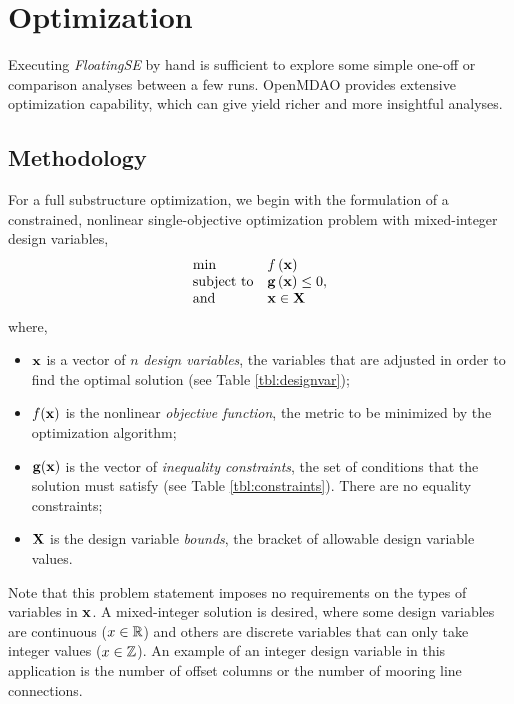 \chapter{Optimization}
\label{sec:opt}
Executing \textit{FloatingSE} by hand is sufficient to explore some simple
one-off or comparison analyses between a few runs.  OpenMDAO
provides extensive optimization capability, which can give yield richer
and more insightful analyses.

\section{Methodology}
For a full substructure optimization, we begin with the formulation of
a constrained, nonlinear single-objective optimization problem with
mixed-integer design variables,
\begin{equation}
\begin{array}{ll}
  \min & f\left(\mathbf{x}\right)\\
  \text{subject to} & \mathbf{g}\left(\mathbf{x}\right) \leq 0,\\
  \text{and}& \mathbf{x} \in \mathbf{X} \\
  \end{array}
\end{equation}
where,
\begin{itemize}
\item $\mathbf{x}$ is a vector of $n$ \textit{design variables}, the variables that are adjusted in order to
  find the optimal solution (see Table \ref{tbl:designvar});
\item $f(\mathbf{x})$ is the nonlinear \textit{objective function}, the
  metric to be minimized by the optimization algorithm;
\item $\mathbf{g} (\mathbf{x})$ is the vector of \textit{inequality constraints}, the
  set of conditions that the solution must satisfy (see Table
  \ref{tbl:constraints}).  There are no equality constraints;
\item $\mathbf{X}$ is the design variable \textit{bounds}, the bracket of
  allowable design variable values.
\end{itemize}

Note that this problem statement imposes no requirements on the types of
variables in $\mathbf{x}$.  A mixed-integer solution is desired, where some
design variables are continuous ($x \in \mathbb{R}$) and others are
discrete variables that can only take integer values ($x \in
\mathbb{Z}$).  An example of an integer design variable in this
application is the number of offset columns or the number of mooring
line connections.


